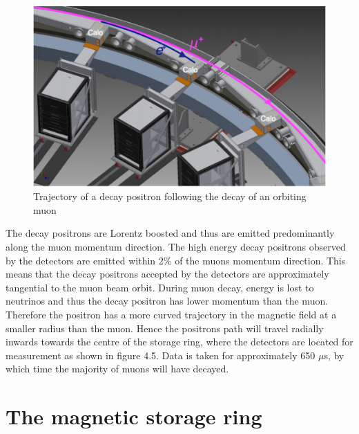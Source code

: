 \begin{figure}[th]
\centering
\includegraphics[scale=0.7]{Figures/positronDecay}
\decoRule
\caption{Trajectory of a decay positron following the decay of an orbiting muon \cite{Reference29}}
\label{fig:positronDecay}
\end{figure}

The decay positrons are Lorentz boosted and thus are emitted predominantly along the muon momentum direction. The high energy decay positrons observed by the detectors are emitted within 2$\%$ of the muons momentum direction. This means that the decay positrons accepted by the detectors are approximately tangential to the muon beam orbit. During muon decay, energy is lost to neutrinos and thus the decay positron has lower momentum than the muon. Therefore the positron has a more curved trajectory in the magnetic field at a smaller radius than the muon. Hence the positrons path will travel radially inwards towards the centre of the storage ring, where the detectors are located for measurement as shown in figure 4.5. Data is taken for approximately 650 $\mu$s, by which time the majority of muons will have decayed. 

\section{The magnetic storage ring}

